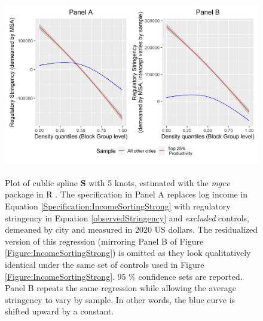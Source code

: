 \documentclass[12pt]{article}
\begin{document}
	\begin{figure}[htbp!]
		\begin{center}
			\includegraphics[width=\textwidth]{incomestringency_combined.png}
			\caption{\\ Plot of cublic spline $\mathbf{S}$ with 5 knots, estimated with the \textit{mgcv} package in R \citep{gampackage}. The specification in Panel A replaces log income in Equation \eqref{Specification:IncomeSortingStrong} with regulatory stringency in Equation \eqref{observedStringency} and \textit{excluded} controls, demeaned by city and measured in 2020 US dollars. The residualized version of this regression (mirroring Panel B of Figure \ref{Figure:IncomeSortingStrong}) is omitted as they look qualitatively identical under the same set of controls used in Figure \ref{Figure:IncomeSortingStrong}. 95 \% confidence sets are reported. Panel B repeats the same regression while allowing the average stringency to vary by sample. In other words, the blue curve is shifted upward by a constant. }\label{Figure:StringencyStrong} 
		\end{center}
	\end{figure}
	
\end{document}
